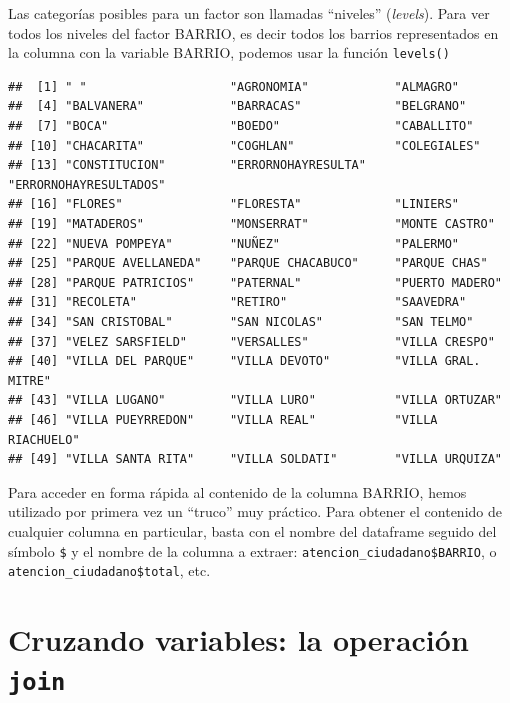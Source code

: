 \documentclass[]{book}
\newenvironment{Shaded}{\begin{snugshade}}{\end{snugshade}}
\newcommand{\KeywordTok}[1]{\textcolor[rgb]{0.13,0.29,0.53}{\textbf{#1}}}
\newcommand{\OperatorTok}[1]{\textcolor[rgb]{0.81,0.36,0.00}{\textbf{#1}}}
\newcommand{\NormalTok}[1]{#1}
\begin{document}
Las categorías posibles para un factor son llamadas ``niveles''
(\emph{levels}). Para ver todos los niveles del factor BARRIO, es decir
todos los barrios representados en la columna con la variable BARRIO,
podemos usar la función \texttt{levels()}

\begin{Shaded}
\end{Shaded}

\begin{verbatim}
##  [1] " "                    "AGRONOMIA"            "ALMAGRO"             
##  [4] "BALVANERA"            "BARRACAS"             "BELGRANO"            
##  [7] "BOCA"                 "BOEDO"                "CABALLITO"           
## [10] "CHACARITA"            "COGHLAN"              "COLEGIALES"          
## [13] "CONSTITUCION"         "ERRORNOHAYRESULTA"    "ERRORNOHAYRESULTADOS"
## [16] "FLORES"               "FLORESTA"             "LINIERS"             
## [19] "MATADEROS"            "MONSERRAT"            "MONTE CASTRO"        
## [22] "NUEVA POMPEYA"        "NUÑEZ"                "PALERMO"             
## [25] "PARQUE AVELLANEDA"    "PARQUE CHACABUCO"     "PARQUE CHAS"         
## [28] "PARQUE PATRICIOS"     "PATERNAL"             "PUERTO MADERO"       
## [31] "RECOLETA"             "RETIRO"               "SAAVEDRA"            
## [34] "SAN CRISTOBAL"        "SAN NICOLAS"          "SAN TELMO"           
## [37] "VELEZ SARSFIELD"      "VERSALLES"            "VILLA CRESPO"        
## [40] "VILLA DEL PARQUE"     "VILLA DEVOTO"         "VILLA GRAL. MITRE"   
## [43] "VILLA LUGANO"         "VILLA LURO"           "VILLA ORTUZAR"       
## [46] "VILLA PUEYRREDON"     "VILLA REAL"           "VILLA RIACHUELO"     
## [49] "VILLA SANTA RITA"     "VILLA SOLDATI"        "VILLA URQUIZA"
\end{verbatim}

Para acceder en forma rápida al contenido de la columna BARRIO, hemos
utilizado por primera vez un ``truco'' muy práctico. Para obtener el
contenido de cualquier columna en particular, basta con el nombre del
dataframe seguido del símbolo \texttt{\$} y el nombre de la columna a
extraer: \texttt{atencion\_ciudadano\$BARRIO}, o
\texttt{atencion\_ciudadano\$total}, etc.

\section{\texorpdfstring{Cruzando variables: la operación
\texttt{join}}{Cruzando variables: la operación join}}\label{cruzando-variables-la-operacion-join}
\end{document}
